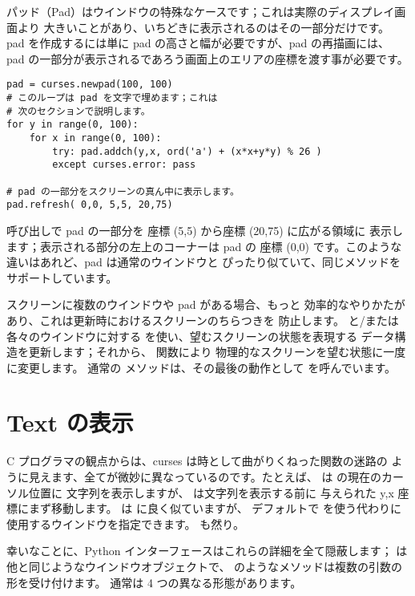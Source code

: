 \documentclass{howto}
\begin{document}
パッド（Pad）はウインドウの特殊なケースです；これは実際のディスプレイ画面より
大きいことがあり、いちどきに表示されるのはその一部分だけです。
pad を作成するには単に pad の高さと幅が必要ですが、pad の再描画には、
pad の一部分が表示されるであろう画面上のエリアの座標を渡す事が必要です。

\begin{verbatim}
pad = curses.newpad(100, 100)
# このループは pad を文字で埋めます；これは
# 次のセクションで説明します。
for y in range(0, 100):
    for x in range(0, 100):
        try: pad.addch(y,x, ord('a') + (x*x+y*y) % 26 )
        except curses.error: pass

# pad の一部分をスクリーンの真ん中に表示します。
pad.refresh( 0,0, 5,5, 20,75)
\end{verbatim}


 呼び出しで pad の一部分を
座標 (5,5) から座標 (20,75) に広がる領域に
表示します；表示される部分の左上のコーナーは pad の
座標 (0,0) です。このような違いはあれど、pad は通常のウインドウと
ぴったり似ていて、同じメソッドをサポートしています。

スクリーンに複数のウインドウや pad がある場合、もっと
効率的なやりかたがあり、これは更新時におけるスクリーンのちらつきを
防止します。 と/または各々のウインドウに対する 
 を使い、望むスクリーンの状態を表現する
データ構造を更新します；それから、 関数により
物理的なスクリーンを望む状態に一度に変更します。
通常の  メソッドは、その最後の動作として
 を呼んでいます。

\section{Text の表示}

C プログラマの観点からは、curses は時として曲がりくねった関数の迷路の
ように見えます、全てが微妙に異なっているのです。たとえば、
 は  の現在のカーソル位置に
文字列を表示しますが、 は文字列を表示する前に
与えられた y,x 座標にまず移動します。
 は  に良く似ていますが、
デフォルトで  を使う代わりに使用するウインドウを指定できます。
 も然り。

幸いなことに、Python インターフェースはこれらの詳細を全て隠蔽します；
 は他と同じようなウインドウオブジェクトで、
 のようなメソッドは複数の引数の形を受け付けます。
通常は 4 つの異なる形態があります。
\end{document}
